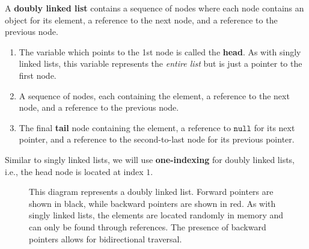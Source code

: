   \begin{definition}
    A \textbf{doubly linked list} contains a sequence of nodes where each node contains an object for its element, a reference to the next node, and a reference to the previous node.
    \begin{enumerate}
      \item The variable which points to the 1st node is called the \textbf{head}. As with singly linked lists, this variable represents the \textit{entire list} but is just a pointer to the first node.
      \item A sequence of nodes, each containing the element, a reference to the next node, and a reference to the previous node.
      \item The final \textbf{tail} node containing the element, a reference to $\texttt{null}$ for its next pointer, and a reference to the second-to-last node for its previous pointer.
    \end{enumerate}
    Similar to singly linked lists, we will use \textbf{one-indexing} for doubly linked lists, i.e., the head node is located at index $1$.
    \begin{figure}[H]
      \centering 
      \caption{This diagram represents a doubly linked list. Forward pointers are shown in black, while backward pointers are shown in red. As with singly linked lists, the elements are located randomly in memory and can only be found through references. The presence of backward pointers allows for bidirectional traversal.}
      \label{fig:doubly_linked_list}
    \end{figure}
  \end{definition} 

